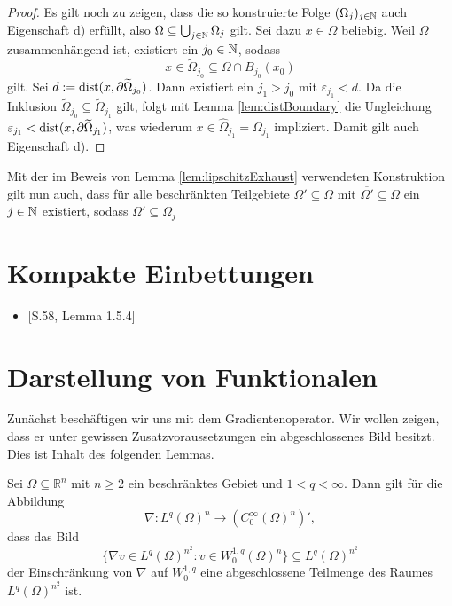 \begin{proof}
  Es gilt noch zu zeigen, dass die so konstruierte Folge $(\Omega_j)_{j \in \mathbb{N}}$ auch Eigenschaft d) erfüllt, also $ \Omega \subseteq \bigcup_{j \in \mathbb{N}} \Omega_j $ gilt.
  Sei dazu $x \in \Omega$ beliebig.
  Weil $\Omega$ zusammenhängend ist, existiert ein $j_0 \in \mathbb{N}$, sodass
  $$
  x \in \widetilde\Omega_{j_0} \subseteq \Omega \cap B_{j_0}(x_0)
  $$
  gilt.
  Sei $d:=\operatorname{dist}(x, \partial\widetilde\Omega_{j_0})$.
  Dann existiert ein $j_1 > j_0$ mit $\varepsilon_{j_1} < d$.
  Da die Inklusion $\widetilde\Omega_{j_0} \subseteq \widetilde\Omega_{j_1}$ gilt, folgt mit Lemma \ref{lem:distBoundary} die Ungleichung $\varepsilon_{j_1} < \operatorname{dist}(x,\partial\widetilde\Omega_{j_1})$, was wiederum $x \in \widehat\Omega_{j_1} = \Omega_{j_1}$ impliziert.
  Damit gilt auch Eigenschaft d).
\end{proof}

\begin{bem}
  Mit der im Beweis von Lemma \ref{lem:lipschitzExhaust} verwendeten Konstruktion gilt nun auch, dass für alle beschränkten Teilgebiete $\Omega' \subseteq \Omega$ mit $\overline{\Omega'} \subseteq \Omega$ ein $j \in \mathbb{N}$ existiert, sodass $\Omega' \subseteq \Omega_j$
\end{bem}

\section{Kompakte Einbettungen}

\begin{itemize}
  \item \cite{sohr2001navier}[S.58, Lemma 1.5.4]
\end{itemize}

\begin{lem}
  \label{lem:compactEmbedding}
\end{lem}

\section{Darstellung von Funktionalen}

Zunächst beschäftigen wir uns mit dem Gradientenoperator.
Wir wollen zeigen, dass er unter gewissen Zusatzvoraussetzungen ein abgeschlossenes Bild besitzt.
Dies ist Inhalt des folgenden Lemmas.

\begin{lem}
  \label{lem:closedImageGradient}
  Sei $\Omega \subseteq \mathbb{R}^n$ mit $n \geq 2$ ein beschränktes Gebiet und $1 < q < \infty$.
  Dann gilt für die Abbildung
  $$
  \nabla \colon L^{q}(\Omega)^{n} \to (C_0^\infty(\Omega)^n)',
  $$
  dass das Bild
  $$
  \{\nabla v \in L^{q}(\Omega)^{n^2} \colon v \in W_0^{1,q}(\Omega)^n\} \subseteq L^{q}(\Omega)^{n^2}
  $$
  der Einschränkung von $\nabla$ auf $W_0^{1,q}$ eine abgeschlossene Teilmenge des Raumes $L^q(\Omega)^{n^2}$ ist.
\end{lem}

